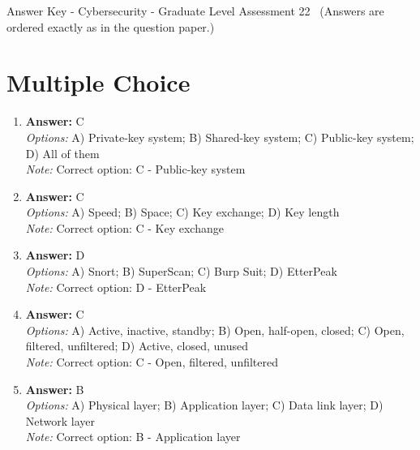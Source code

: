 \documentclass[12pt]{article}
\begin{document}
\begin{center}
Answer Key - Cybersecurity - Graduate Level Assessment 22 \
\small (Answers are ordered exactly as in the question paper.)
\end{center}

\section*{Multiple Choice}
\begin{enumerate}[label=\arabic*.]
\item \textbf{Answer:} C
\\ \textit{Options:} A) Private-key system; B) Shared-key system; C) Public-key system; D) All of them
\\ \textit{Note:} Correct option: C - Public-key system
\item \textbf{Answer:} C
\\ \textit{Options:} A) Speed; B) Space; C) Key exchange; D) Key length
\\ \textit{Note:} Correct option: C - Key exchange
\item \textbf{Answer:} D
\\ \textit{Options:} A) Snort; B) SuperScan; C) Burp Suit; D) EtterPeak
\\ \textit{Note:} Correct option: D - EtterPeak
\item \textbf{Answer:} C
\\ \textit{Options:} A) Active, inactive, standby; B) Open, half-open, closed; C) Open, filtered, unfiltered; D) Active, closed, unused
\\ \textit{Note:} Correct option: C - Open, filtered, unfiltered
\item \textbf{Answer:} B
\\ \textit{Options:} A) Physical layer; B) Application layer; C) Data link layer; D) Network layer
\\ \textit{Note:} Correct option: B - Application layer
\end{enumerate}
\end{document}
